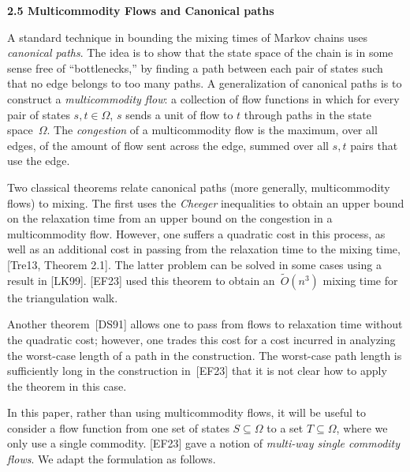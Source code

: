 \par\medskip\noindent\textbf{2.5 Multicommodity Flows and Canonical paths}\par




A standard technique in bounding the mixing times of Markov chains uses \emph{canonical paths}. The idea is to show that the state space of the chain is in some sense free of “bottlenecks,” by finding a path between each pair of states such that no edge belongs to too many paths. A generalization of canonical paths is to construct a \emph{multicommodity flow}: a collection of flow functions in which for every pair of states $s,t\in\Omega$, $s$ sends a unit of flow to $t$ through paths in the state space $\Omega$. The \emph{congestion} of a multicommodity flow is the maximum, over all edges, of the amount of flow sent across the edge, summed over all $s,t$ pairs that use the edge.\par




Two classical theorems relate canonical paths (more generally, multicommodity flows) to mixing. The first uses the \emph{Cheeger} inequalities to obtain an upper bound on the relaxation time from an upper bound on the congestion in a multicommodity flow. However, one suffers a quadratic cost in this process, as well as an additional cost in passing from the relaxation time to the mixing time, [Tre13, Theorem 2.1]. The latter problem can be solved in some cases using a result in [LK99]. [EF23] used this theorem to obtain an $\widetilde{O}(n^{3})$ mixing time for the triangulation walk.\par




Another theorem [DS91] allows one to pass from flows to relaxation time without the quadratic cost; however, one trades this cost for a cost incurred in analyzing the worst-case length of a path in the construction. The worst-case path length is sufficiently long in the construction in [EF23] that it is not clear how to apply the theorem in this case.\par




In this paper, rather than using multicommodity flows, it will be useful to consider a flow function from one set of states $S\subseteq\Omega$ to a set $T\subseteq\Omega$, where we only use a single commodity. [EF23] gave a notion of \emph{multi-way single commodity flows}. We adapt the formulation as follows.\par




